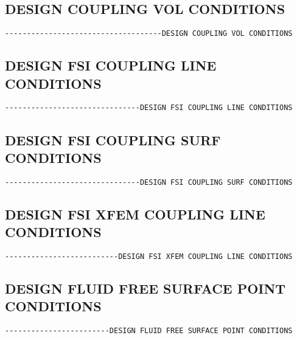 
\subsection{DESIGN COUPLING VOL CONDITIONS}
\begin{verbatim}
------------------------------------DESIGN COUPLING VOL CONDITIONS
\end{verbatim}



\subsection{DESIGN FSI COUPLING LINE CONDITIONS}
\begin{verbatim}
-------------------------------DESIGN FSI COUPLING LINE CONDITIONS
\end{verbatim}


\subsection{DESIGN FSI COUPLING SURF CONDITIONS}
\begin{verbatim}
-------------------------------DESIGN FSI COUPLING SURF CONDITIONS
\end{verbatim}


\subsection{DESIGN FSI XFEM COUPLING LINE CONDITIONS}
\begin{verbatim}
--------------------------DESIGN FSI XFEM COUPLING LINE CONDITIONS
\end{verbatim}


\subsection{DESIGN FLUID FREE SURFACE POINT CONDITIONS}
\begin{verbatim}
------------------------DESIGN FLUID FREE SURFACE POINT CONDITIONS
\end{verbatim}

